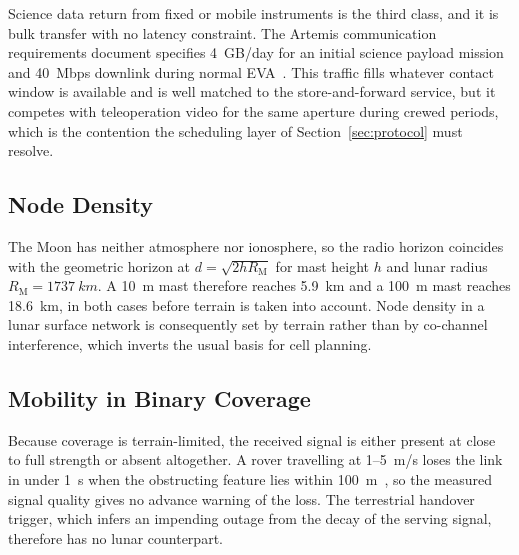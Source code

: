 \documentclass[11pt,a4paper]{article}
\begin{document}
Science data return from fixed or mobile instruments is the third class, and it is bulk transfer with no latency constraint. The Artemis communication requirements document specifies \SI{4}{GB/day} for an initial science payload mission and \SI{40}{Mbps} downlink during normal EVA~\cite{nasa_arts_comm}. This traffic fills whatever contact window is available and is well matched to the store-and-forward service, but it competes with teleoperation video for the same aperture during crewed periods, which is the contention the scheduling layer of Section~\ref{sec:protocol} must resolve.

\subsection{Node Density}
The Moon has neither atmosphere nor ionosphere, so the radio horizon coincides with the geometric horizon at $d = \sqrt{2 h R_{\mathrm{M}}}$ for mast height $h$ and lunar radius $R_{\mathrm{M}} = \SI{1737}{km}$. A \SI{10}{m} mast therefore reaches \SI{5.9}{km} and a \SI{100}{m} mast reaches \SI{18.6}{km}, in both cases before terrain is taken into account. Node density in a lunar surface network is consequently set by terrain rather than by co-channel interference, which inverts the usual basis for cell planning.

\subsection{Mobility in Binary Coverage}
Because coverage is terrain-limited, the received signal is either present at close to full strength or absent altogether. A rover travelling at \SI{1}{}--\SI{5}{m/s} loses the link in under \SI{1}{\second} when the obstructing feature lies within \SI{100}{m}~\cite{azami_terrain_aware}, so the measured signal quality gives no advance warning of the loss. The terrestrial handover trigger, which infers an impending outage from the decay of the serving signal, therefore has no lunar counterpart.
\end{document}
